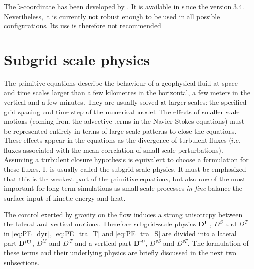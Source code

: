 \documentclass[../main/NEMO_manual]{subfiles}
\begin{document}
The $\tilde{z}$-coordinate has been developed by \citet{Leclair_Madec_OM11}.
It is available in \NEMO since the version 3.4.
Nevertheless, it is currently not robust enough to be used in all possible configurations.
Its use is therefore not recommended.


\newpage 

\section{Subgrid scale physics}
\label{sec:PE_zdf_ldf}

The primitive equations describe the behaviour of a geophysical fluid at space and time scales larger than
a few kilometres in the horizontal, a few meters in the vertical and a few minutes.
They are usually solved at larger scales: the specified grid spacing and time step of the numerical model.
The effects of smaller scale motions (coming from the advective terms in the Navier-Stokes equations) must be represented entirely in terms of large-scale patterns to close the equations.
These effects appear in the equations as the divergence of turbulent fluxes
($i.e.$ fluxes associated with the mean correlation of small scale perturbations).
Assuming a turbulent closure hypothesis is equivalent to choose a formulation for these fluxes.
It is usually called the subgrid scale physics.
It must be emphasized that this is the weakest part of the primitive equations,
but also one of the most important for long-term simulations as
small scale processes \textit{in fine} balance the surface input of kinetic energy and heat.

The control exerted by gravity on the flow induces a strong anisotropy between the lateral and vertical motions.
Therefore subgrid-scale physics \textbf{D}$^{\mathbf{U}}$, $D^{S}$ and $D^{T}$  in
\autoref{eq:PE_dyn}, \autoref{eq:PE_tra_T} and \autoref{eq:PE_tra_S} are divided into
a lateral part  \textbf{D}$^{l \mathbf{U}}$, $D^{lS}$ and $D^{lT}$ and
a vertical part  \textbf{D}$^{vU}$, $D^{vS}$ and $D^{vT}$.
The formulation of these terms and their underlying physics are briefly discussed in the next two subsections.

\end{document}
